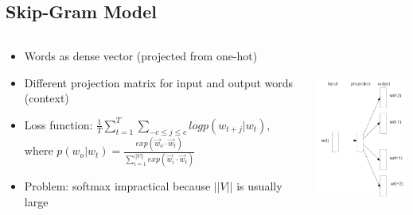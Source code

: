 \documentclass[compress]{beamer}
\begin{document}
\subsection{Skip-Gram Model}
\begin{frame}{\subsecname}
	\begin{columns}[T] %
    	\begin{column}[T]{.6\textwidth} %
          \begin{itemize}
            \item Words as dense vector (projected from one-hot)
            \item Different projection matrix for input and output words (context)
            \item Loss function: $\frac{1}{T}\sum\limits_{t=1}^T\sum\limits_{-c \leq j \leq c} logp(w_{t+j}|w_t) $, where $p(w_o|w_t)=\frac{exp(\vec{w}_o\cdot \vec{w}_t)}{\sum_{i=1}^{||V||}exp(\vec{w}_i\cdot \vec{w}_t)}$
            \item Problem: softmax impractical because $||V||$ is usually large 
          \end{itemize}
    	 \end{column}
     	\begin{column}[T]{.4\textwidth} %
      		\includegraphics[height=6cm]{skip_gram.png}
     	\end{column}
     \end{columns}
\end{frame}
\end{document}
